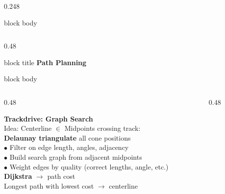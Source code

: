 \documentclass[final]{beamer}
\begin{document}
\begin{frame}[t,fragile]{}
\begin{columns}[t,totalwidth=\textwidth]
\begin{column}{0.248\textwidth}
\begin{beamercolorbox}[rounded=true,sep=0.38cm,wd=\linewidth]{block body}
\end{beamercolorbox}
\end{column}


\end{columns}

\vspace{0.6cm}

\begin{columns}[t,totalwidth=\textwidth]

\begin{column}{0.48\textwidth}

\begin{beamercolorbox}[rounded=true,sep=0.30cm,wd=\linewidth]{block title}
  \large\bfseries Path Planning
\end{beamercolorbox}

\begin{beamercolorbox}[rounded=true,sep=0.38cm,wd=\linewidth,ht=37.3cm]{block body}

\begin{columns}[t]
\begin{column}{0.48\linewidth}

  \begin{tcolorbox}[pbox]
    {\color{primary}\bfseries Trackdrive: Graph Search}\\[3pt]
    \small
    Idea: Centerline $\in$ Midpoints crossing track:\\
    \textbf{Delaunay triangulate} all cone positions\\
    $\bullet$ Filter on edge length, angles, adjacency\\
    $\bullet$ Build search graph from adjacent midpoints \\
    $\bullet$ Weight edges by quality (correct lengths, angle, etc.)\\
    \textbf{Dijkstra} $\to$ path cost \\
    Longest path with lowest cost $\to$ centerline
  \end{tcolorbox}

  \vspace{0.9cm}
  \centering
  

\end{column}

\begin{column}{0.48\linewidth}


\end{column}
\end{columns}
\end{beamercolorbox}
\end{column}
\end{columns}
\end{frame}
\end{document}
